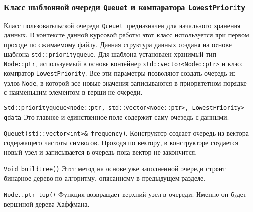 \subsubsection{Класс шаблонной очереди \texttt{Queue{\textunderscore}t} и компаратора \texttt{LowestPriority}}


Класс пользовательской очереди \texttt{Queue{\textunderscore}t} предназначен для начального хранения данных.
В контексте данной курсовой работы этот класс используется при первом проходе по сжимаемому файлу.
Данная структура данных создана на основе шаблона \texttt{std::priority{\textunderscore}queue}.
Для шаблона установлен хранимый тип \texttt{Node::ptr}, используемый в основе контейнер \texttt{std::vector<Node::ptr>} и класс компратор \texttt{LowestPriority}.
Все эти параметры позволяют создать очередь из узлов \texttt{Node}, в которой все новые значения записываются в приоритетном порядке с наименьшим элементом в верши не очереди.



\texttt{Std::priority{\textunderscore}queue<Node::ptr, std::vector<Node::ptr>, LowestPriority> q{\textunderscore}data} 
Это главное и единственное поле содержит саму очередь с данными.



\texttt{Queue{\textunderscore}t(std::vector<int>\& frequency)}.
Конструктор создает очередь из вектора содержащего частоты символов.
Проходя по вектору, в конструкторе создается новый узел и записывается в очередь пока вектор не закончится.



\texttt{Void build{\textunderscore}tree()} 
Этот метод на основе уже заполненной очереди строит бинарное дерево по алгоритму, описанному в предыдущем разделе.



\texttt{Node::ptr top()}
Функция возвращает верхний узел в очереди. 
Именно он будет вершиной дерева Хаффмана.